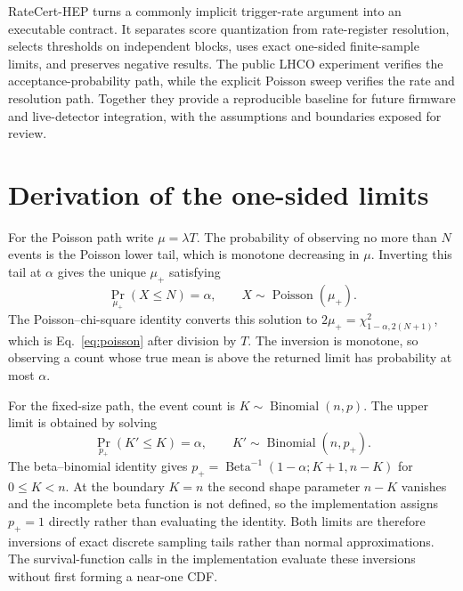 \documentclass[preprint,12pt]{elsarticle}
\begin{document}
RateCert-HEP turns a commonly implicit trigger-rate argument into an executable
contract.  It separates score quantization from rate-register resolution,
selects thresholds on independent blocks, uses exact one-sided finite-sample
limits, and preserves negative results.  The public LHCO experiment verifies
the acceptance-probability path, while the explicit Poisson sweep verifies the
rate and resolution path.  Together they provide a reproducible baseline for
future firmware and live-detector integration, with the assumptions and
boundaries exposed for review.

\appendix

\section{Derivation of the one-sided limits}
\label{app:limits}

For the Poisson path write $\mu=\lambda T$.  The probability of observing no
more than $N$ events is the Poisson lower tail, which is monotone decreasing in
$\mu$.  Inverting this tail at $\alpha$ gives the unique $\mu_+$ satisfying
\begin{equation}
 \Pr_{\mu_+}(X\le N)=\alpha,
 \qquad X\sim\operatorname{Poisson}(\mu_+).
 \label{eq:poisson-inversion}
\end{equation}
The Poisson--chi-square identity converts this solution to
$2\mu_+=\chi^2_{1-\alpha,2(N+1)}$, which is Eq.~\eqref{eq:poisson} after
division by $T$.  The inversion is monotone, so observing a count whose true
mean is above the returned limit has probability at most $\alpha$.

For the fixed-size path, the event count is $K\sim\operatorname{Binomial}(n,p)$.
The upper limit is obtained by solving
\begin{equation}
 \Pr_{p_+}(K'\le K)=\alpha,
 \qquad K'\sim\operatorname{Binomial}(n,p_+).
 \label{eq:binomial-inversion}
\end{equation}
The beta--binomial identity gives
$p_+=\operatorname{Beta}^{-1}(1-\alpha;K+1,n-K)$ for $0\le K<n$.  At the
boundary $K=n$ the second shape parameter $n-K$ vanishes and the incomplete
beta function is not defined, so the implementation assigns $p_+=1$ directly
rather than evaluating the identity.  Both limits are therefore inversions of
exact discrete sampling tails rather than normal approximations.  The
survival-function calls in the implementation evaluate these inversions without
first forming a near-one CDF.
\end{document}

